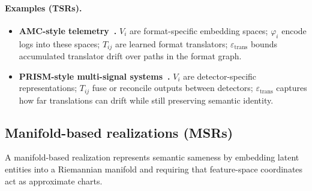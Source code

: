 \documentclass[11pt]{article}
\begin{document}
\paragraph{Examples (TSRs).}
\begin{itemize}[leftmargin=*]
\item \textbf{AMC-style telemetry~\cite{davis2025amc}.} $V_i$ are format-specific embedding 
spaces; $\varphi_i$ encode logs into these spaces; $T_{ij}$ are learned format translators; 
$\varepsilon_{\mathrm{trans}}$ bounds accumulated translator drift over paths in the format graph.

\item \textbf{PRISM-style multi-signal systems~\cite{davis2025prism}.} $V_i$ are detector-specific 
representations; $T_{ij}$ fuse or reconcile outputs between detectors; $\varepsilon_{\mathrm{trans}}$ 
captures how far translations can drift while still preserving semantic identity.
\end{itemize}

\subsection{Manifold-based realizations (MSRs)}
\label{subsec:msr}

A manifold-based realization represents semantic sameness by embedding latent entities into
a Riemannian manifold and requiring that feature-space coordinates act as approximate charts.
\end{document}

